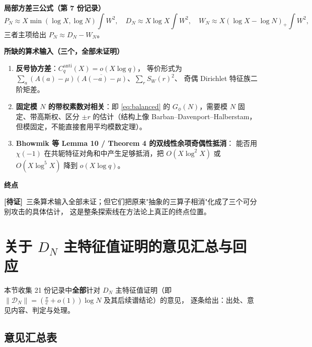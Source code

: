 \documentclass[11pt,a4paper]{ctexart}
\newcommand{\OPEN}{\textcolor{red!70!black}{\textbf{[待证]}}}
\begin{document}
\textbf{局部方差三公式（第 7 份记录）}
\begin{equation}\label{eq:threevar}
P_N\approx X\min(\log X,\log N)\!\int\! W^2,\quad
D_N\approx X\log X\!\int\! W^2,\quad
W_N\approx X(\log X-\log N)_+\!\int\! W^2,
\end{equation}
三者主项给出 $P_N\approx D_N-W_N$。

\textbf{所缺的算术输入（三个，全部未证明）}
\begin{enumerate}[label=\textbf{(A\arabic*)}]
\item \textbf{反号协方差}：$C_q^{\mathrm{anti}}(X)=o(X\log q)$，
等价形式为 $\sum_a(A(a)-\mu)\overline{(A(-a)-\mu)}$、$\sum_r S_W(r)^2$、
奇偶 Dirichlet 特征族二阶矩差。
\item \textbf{固定模 $N$ 的带权素数对相关}：即 \eqref{eq:balanced} 的
$G_\phi(N)$，需要模 $N$ 固定、带高斯权、区分 $\pm r$ 的估计（结构上像 Barban--Davenport--Halberstam，
但模固定，不能直接套用平均模数定理）。
\item \textbf{Bhowmik 等 Lemma 10 / Theorem 4 的双线性余项奇偶性抵消}：
能否用 $\chi(-1)$ 在共轭特征对角和中产生足够抵消，把 $O(X\log^2X)$ 或 $O(X\log^5X)$ 降到 $o(X\log q)$。
\end{enumerate}

\textbf{终点}

\OPEN\ 三条算术输入全部未证；但它们把原来"抽象的三算子相消"化成了三个可分别攻击的具体估计，
这是整条探索线在方法论上真正的终点位置。

\section{关于 $D_N$ 主特征值证明的意见汇总与回应}\label{sec:opinions}

本节收集 21 份记录中\textbf{全部}针对 $D_N$ 主特征值证明（即
$\|\mathcal D_N\|=(\frac{\pi}{e}+o(1))\log N$ 及其后续谱结论）的意见，
逐条给出：出处、意见内容、判定与处理。

\subsection*{意见汇总表}
\end{document}
